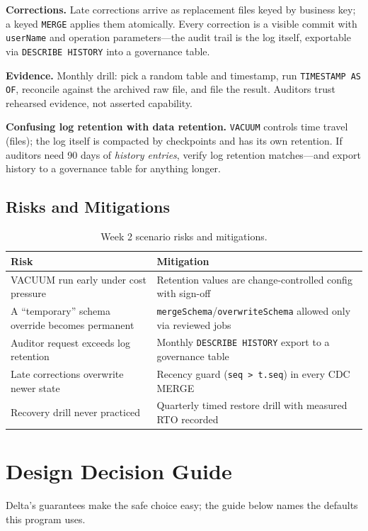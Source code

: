 \textbf{Corrections.} Late corrections arrive as replacement files keyed by business key; a keyed \texttt{MERGE} applies them atomically. Every correction is a visible commit with \texttt{userName} and operation parameters---the audit trail is the log itself, exportable via \texttt{DESCRIBE HISTORY} into a governance table.

\textbf{Evidence.} Monthly drill: pick a random table and timestamp, run \texttt{TIMESTAMP AS OF}, reconcile against the archived raw file, and file the result. Auditors trust rehearsed evidence, not asserted capability.

\begin{pitfall}
\textbf{Confusing log retention with data retention.} \texttt{VACUUM} controls time travel (files); the log itself is compacted by checkpoints and has its own retention. If auditors need 90 days of \emph{history entries}, verify log retention matches---and export history to a governance table for anything longer.
\end{pitfall}

\subsection{Risks and Mitigations}
\begin{table}[H]
\centering
\small
\begin{tabular}{@{}p{4.6cm}p{7.6cm}@{}}
\toprule
\textbf{Risk} & \textbf{Mitigation} \\
\midrule
VACUUM run early under cost pressure & Retention values are change-controlled config with sign-off \\
A ``temporary'' schema override becomes permanent & \texttt{mergeSchema}/\texttt{overwriteSchema} allowed only via reviewed jobs \\
Auditor request exceeds log retention & Monthly \texttt{DESCRIBE HISTORY} export to a governance table \\
Late corrections overwrite newer state & Recency guard (\texttt{seq > t.seq}) in every CDC MERGE \\
Recovery drill never practiced & Quarterly timed restore drill with measured RTO recorded \\
\bottomrule
\end{tabular}
\caption{Week 2 scenario risks and mitigations.}
\label{tab:ch2-risks}
\end{table}

\section{Design Decision Guide}
%
Delta's guarantees make the safe choice easy; the guide below names the defaults this program uses.

